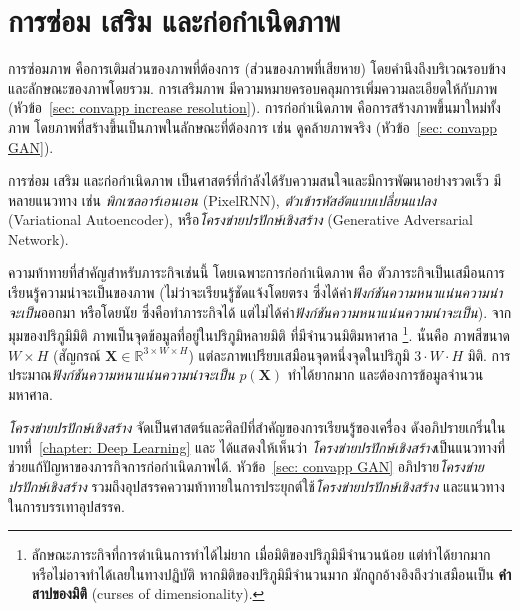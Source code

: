 \section{การซ่อม เสริม และก่อกำเนิดภาพ}
\label{sec: convapp fix enhance gen images}

การซ่อมภาพ คือการเติมส่วนของภาพที่ต้องการ (ส่วนของภาพที่เสียหาย)
โดยคำนึงถึงบริเวณรอบข้าง และลักษณะของภาพโดยรวม.
การเสริมภาพ มีความหมายครอบคลุมการเพิ่มความละเอียดให้กับภาพ (หัวข้อ~\ref{sec: convapp increase resolution}).
การก่อกำเนิดภาพ คือการสร้างภาพขึ้นมาใหม่ทั้งภาพ โดยภาพที่สร้างขึ้นเป็นภาพในลักษณะที่ต้องการ 
เช่น ดูคล้ายภาพจริง (หัวข้อ~\ref{sec: convapp GAN}).

การซ่อม เสริม และก่อกำเนิดภาพ เป็นศาสตร์ที่กำลังได้รับความสนใจและมีการพัฒนาอย่างรวดเร็ว
มีหลายแนวทาง เช่น \textit{พิกเซลอาร์เอนเอน} (PixelRNN\cite{pixelRNN2016}),
\textit{ตัวเข้ารหัสอัตแบบเปลี่ยนแปลง} (Variational Autoencoder\cite{VAE2019}),
หรือ\textit{โครงข่ายปรปักษ์เชิงสร้าง} (Generative Adversarial Network\cite{GoodfellowEtAl2014a, PalssonEtAl2018}).

ความท้าทายที่สำคัญสำหรับภาระกิจเช่นนี้ โดยเฉพาะการก่อกำเนิดภาพ 
คือ ตัวภาระกิจเป็นเสมือนการเรียนรู้ความน่าจะเป็นของภาพ 
(ไม่ว่าจะเรียนรู้ชัดแจ้งโดยตรง ซึ่งได้ค่า\textit{ฟังก์ชันความหนาแน่นความน่าจะเป็น}ออกมา หรือโดยนัย ซึ่งคือทำภาระกิจได้ แต่ไม่ได้ค่า\textit{ฟังก์ชันความหนาแน่นความน่าจะเป็น}).
จากมุมของปริภูมิมิติ ภาพเป็นจุดข้อมูลที่อยู่ในปริภูมิหลายมิติ ที่มีจำนวนมิติมหาศาล%
\footnote{%
ลักษณะภาระกิจที่การดำเนินการทำได้ไม่ยาก เมื่อมิติของปริภูมิมีจำนวนน้อย แต่ทำได้ยากมาก หรือไม่อาจทำได้เลยในทางปฏิบัติ 
หากมิติของปริภูมิมีจำนวนมาก มักถูกอ้างอิงถึงว่าเสมือนเป็น \textbf{คำสาปของมิติ} (curses of dimensionality).
}.
%
นั่นคือ ภาพสีขนาด $W \times H$ (สัญกรณ์ $\bm{X} \in \mathbb{R}^{3 \times W \times H}$)
แต่ละภาพเปรียบเสมือนจุดหนึ่งจุดในปริภูมิ $3 \cdot W  \cdot H$ มิติ.
การประมาณ\textit{ฟังก์ชันความหนาแน่นความน่าจะเป็น} $p(\bm{X})$ ทำได้ยากมาก และต้องการข้อมูลจำนวนมหาศาล.

\textit{โครงข่ายปรปักษ์เชิงสร้าง} จัดเป็นศาสตร์และศิลป์ที่สำคัญของการเรียนรู้ของเครื่อง 
ดังอภิปรายเกริ่นในบทที่~\ref{chapter: Deep Learning}
และ
ได้แสดงให้เห็นว่า \textit{โครงข่ายปรปักษ์เชิงสร้าง}เป็นแนวทางที่ช่วยแก้ปัญหาของภารกิจการก่อกำเนิดภาพได้.
หัวข้อ~\ref{sec: convapp GAN} อภิปราย\textit{โครงข่ายปรปักษ์เชิงสร้าง} รวมถึงอุปสรรคความท้าทายในการประยุกต์ใช้\textit{โครงข่ายปรปักษ์เชิงสร้าง} และแนวทางในการบรรเทาอุปสรรค.

